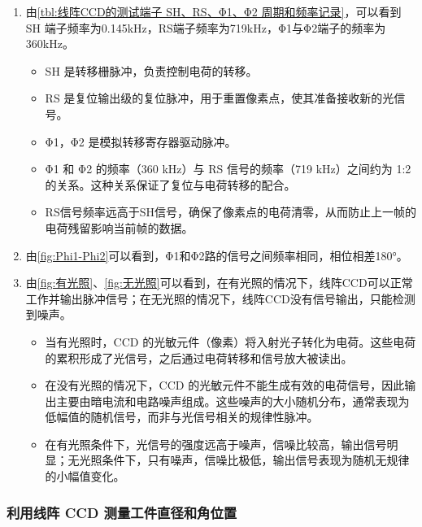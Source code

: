 \documentclass[dvipsnames, svgnames,a4paper,11pt]{article}
\begin{document}
		\begin{enumerate}
			\item 由\cref{tbl:线阵CCD的测试端子 SH、RS、Φ1、Φ2 周期和频率记录}，可以看到 SH 端子频率为0.145kHz，RS端子频率为719kHz，Φ1与Φ2端子的频率为360kHz。
				\begin{itemize}
					\item SH 是转移栅脉冲，负责控制电荷的转移。
					\item RS 是复位输出级的复位脉冲，用于重置像素点，使其准备接收新的光信号。
					\item Φ1，Φ2 是模拟转移寄存器驱动脉冲。
					\item Φ1 和 Φ2 的频率（360 kHz）与 RS 信号的频率（719 kHz）之间约为 1:2 的关系。这种关系保证了复位与电荷转移的配合。
					\item RS信号频率远高于SH信号，确保了像素点的电荷清零，从而防止上一帧的电荷残留影响当前帧的数据。
				\end{itemize}
			\item 由\cref{fig:Phi1-Phi2}可以看到，Φ1和Φ2路的信号之间频率相同，相位相差180°。
			\item 由\cref{fig:有光照}、\cref{fig:无光照}可以看到，在有光照的情况下，线阵CCD可以正常工作并输出脉冲信号；在无光照的情况下，线阵CCD没有信号输出，只能检测到噪声。
				\begin{itemize}
					\item 当有光照时，CCD 的光敏元件（像素）将入射光子转化为电荷。这些电荷的累积形成了光信号，之后通过电荷转移和信号放大被读出。
					\item 在没有光照的情况下，CCD 的光敏元件不能生成有效的电荷信号，因此输出主要由暗电流和电路噪声组成。这些噪声的大小随机分布，通常表现为低幅值的随机信号，而非与光信号相关的规律性脉冲。
					\item 在有光照条件下，光信号的强度远高于噪声，信噪比较高，输出信号明显；无光照条件下，只有噪声，信噪比极低，输出信号表现为随机无规律的小幅值变化。
				\end{itemize}
		\end{enumerate}









	\subsubsection{利用线阵 CCD 测量工件直径和角位置}
\end{document}
